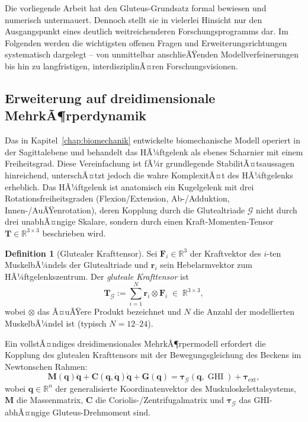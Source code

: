 ﻿\documentclass[12pt,a4paper]{report}
\theoremstyle{plain}
\theoremstyle{definition}
\newtheorem{definition}[theorem]{Definition}
\theoremstyle{remark}
\DeclareMathOperator{\GHI}{GHI}
\begin{document}
	Die vorliegende Arbeit hat den Gluteus-Grundsatz formal bewiesen und numerisch
	untermauert. Dennoch stellt sie in vielerlei Hinsicht nur den Ausgangspunkt
	eines deutlich weitreichenderen Forschungsprogramms dar. Im Folgenden werden
	die wichtigsten offenen Fragen und Erweiterungsrichtungen systematisch
	dargelegt -- von unmittelbar anschlieÃŸenden Modellverfeinerungen bis hin
	zu langfristigen, interdisziplinÃ¤ren Forschungsvisionen.
	
	\subsection{Erweiterung auf dreidimensionale MehrkÃ¶rperdynamik}
	\label{subsec:3d}
	
	Das in Kapitel~\ref{chap:biomechanik} entwickelte biomechanische Modell
	operiert in der Sagittalebene und behandelt das HÃ¼ftgelenk als ebenes
	Scharnier mit einem Freiheitsgrad. Diese Vereinfachung ist fÃ¼r grundlegende
	StabilitÃ¤tsaussagen hinreichend, unterschÃ¤tzt jedoch die wahre KomplexitÃ¤t
	des HÃ¼ftgelenks erheblich. Das HÃ¼ftgelenk ist anatomisch ein
	Kugelgelenk mit drei Rotationsfreiheitsgraden (Flexion/Extension,
	Ab-/Adduktion, Innen-/AuÃŸenrotation), deren Kopplung durch die Glutealtriade
	$\mathcal{G}$ nicht durch drei unabhÃ¤ngige Skalare, sondern durch einen
	Kraft-Momenten-Tensor $\mathbf{T} \in \mathbb{R}^{3\times 3}$ beschrieben wird.
	
	\begin{definition}[Glutealer Krafttensor]
		\label{def:tensor}
		Sei $\mathbf{F}_i \in \mathbb{R}^3$ der Kraftvektor des $i$-ten MuskelbÃ¼ndels
		der Glutealtriade und $\mathbf{r}_i$ sein Hebelarmvektor zum HÃ¼ftgelenkszentrum.
		Der \emph{gluteale Krafttensor} ist
		\[
		\mathbf{T}_\mathcal{G} := \sum_{i=1}^{N} \mathbf{r}_i \otimes \mathbf{F}_i
		\;\in\; \mathbb{R}^{3\times 3},
		\]
		wobei $\otimes$ das Ã¤uÃŸere Produkt bezeichnet und $N$ die Anzahl der
		modellierten MuskelbÃ¼ndel ist (typisch $N = 12$--$24$).
	\end{definition}
	
	Ein vollstÃ¤ndiges dreidimensionales MehrkÃ¶rpermodell erfordert die Kopplung
	des glutealen Krafttensors mit der Bewegungsgleichung des Beckens
	im Newtonschen Rahmen:
	\[
	\mathbf{M}(\mathbf{q})\ddot{\mathbf{q}} + \mathbf{C}(\mathbf{q},\dot{\mathbf{q}})\dot{\mathbf{q}}
	+ \mathbf{G}(\mathbf{q}) = \boldsymbol{\tau}_\mathcal{G}(\mathbf{q}, \GHI) + \boldsymbol{\tau}_{\mathrm{ext}},
	\]
	wobei $\mathbf{q} \in \mathbb{R}^n$ der generalisierte Koordinatenvektor des
	Muskuloskelettalsystems, $\mathbf{M}$ die Massenmatrix,
	$\mathbf{C}$ die Coriolis-/Zentrifugalmatrix und
	$\boldsymbol{\tau}_\mathcal{G}$ das GHI-abhÃ¤ngige Gluteus-Drehmoment sind.
	
\end{document}
